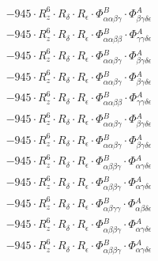 \documentclass{article}
\begin{document}
\begin{subequations}
\begin{gather}
\begin{array}{c}
 \\[0.2em] 		 - 945 \cdot R_{z}^{6} \cdot R_{\delta{}} \cdot R_{\epsilon{}} \cdot \Phi{}^{B}_{\alpha{}\alpha{}\beta{}\gamma{}} \cdot \Phi{}^{A}_{\beta{}\gamma{}\delta{}\epsilon{}} 
 \\[0.2em] 		 - 945 \cdot R_{z}^{6} \cdot R_{\delta{}} \cdot R_{\epsilon{}} \cdot \Phi{}^{B}_{\alpha{}\alpha{}\beta{}\beta{}} \cdot \Phi{}^{A}_{\gamma{}\gamma{}\delta{}\epsilon{}} 
 \\[0.2em] 		 - 945 \cdot R_{z}^{6} \cdot R_{\delta{}} \cdot R_{\epsilon{}} \cdot \Phi{}^{B}_{\alpha{}\alpha{}\beta{}\gamma{}} \cdot \Phi{}^{A}_{\beta{}\gamma{}\delta{}\epsilon{}} 
 \\[0.2em] 		 - 945 \cdot R_{z}^{6} \cdot R_{\delta{}} \cdot R_{\epsilon{}} \cdot \Phi{}^{B}_{\alpha{}\alpha{}\beta{}\gamma{}} \cdot \Phi{}^{A}_{\beta{}\gamma{}\delta{}\epsilon{}} 
 \\[0.2em] 		 - 945 \cdot R_{z}^{6} \cdot R_{\delta{}} \cdot R_{\epsilon{}} \cdot \Phi{}^{B}_{\alpha{}\alpha{}\beta{}\beta{}} \cdot \Phi{}^{A}_{\gamma{}\gamma{}\delta{}\epsilon{}} 
 \\[0.2em] 		 - 945 \cdot R_{z}^{6} \cdot R_{\delta{}} \cdot R_{\epsilon{}} \cdot \Phi{}^{B}_{\alpha{}\alpha{}\beta{}\gamma{}} \cdot \Phi{}^{A}_{\beta{}\gamma{}\delta{}\epsilon{}} 
 \\[0.2em] 		 - 945 \cdot R_{z}^{6} \cdot R_{\delta{}} \cdot R_{\epsilon{}} \cdot \Phi{}^{B}_{\alpha{}\alpha{}\beta{}\gamma{}} \cdot \Phi{}^{A}_{\beta{}\gamma{}\delta{}\epsilon{}} 
 \\[0.2em] 		 - 945 \cdot R_{z}^{6} \cdot R_{\delta{}} \cdot R_{\epsilon{}} \cdot \Phi{}^{B}_{\alpha{}\beta{}\beta{}\gamma{}} \cdot \Phi{}^{A}_{\alpha{}\gamma{}\delta{}\epsilon{}} 
 \\[0.2em] 		 - 945 \cdot R_{z}^{6} \cdot R_{\delta{}} \cdot R_{\epsilon{}} \cdot \Phi{}^{B}_{\alpha{}\beta{}\beta{}\gamma{}} \cdot \Phi{}^{A}_{\alpha{}\gamma{}\delta{}\epsilon{}} 
 \\[0.2em] 		 - 945 \cdot R_{z}^{6} \cdot R_{\delta{}} \cdot R_{\epsilon{}} \cdot \Phi{}^{B}_{\alpha{}\beta{}\gamma{}\gamma{}} \cdot \Phi{}^{A}_{\alpha{}\beta{}\delta{}\epsilon{}} 
 \\[0.2em] 		 - 945 \cdot R_{z}^{6} \cdot R_{\delta{}} \cdot R_{\epsilon{}} \cdot \Phi{}^{B}_{\alpha{}\beta{}\beta{}\gamma{}} \cdot \Phi{}^{A}_{\alpha{}\gamma{}\delta{}\epsilon{}} 
 \\[0.2em] 		 - 945 \cdot R_{z}^{6} \cdot R_{\delta{}} \cdot R_{\epsilon{}} \cdot \Phi{}^{B}_{\alpha{}\beta{}\beta{}\gamma{}} \cdot \Phi{}^{A}_{\alpha{}\gamma{}\delta{}\epsilon{}} 

\end{array}
\end{gather}
\end{subequations}
\end{document}
